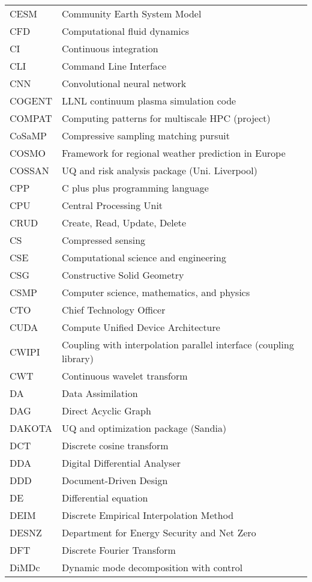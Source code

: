 \begin{longtable}{|p{4.0cm}|p{12.0cm}|}
CESM & Community Earth System Model\\
CFD  & Computational fluid dynamics \\
CI & Continuous integration\\
CLI & Command Line Interface \\
CNN  & Convolutional neural network \\
COGENT & LLNL continuum plasma simulation code\\
COMPAT & Computing patterns for multiscale HPC (project)\\
CoSaMP  & Compressive sampling matching pursuit \\
COSMO & Framework for regional weather prediction in Europe \\
COSSAN & UQ and risk analysis package (Uni. Liverpool)\\
CPP & C plus plus programming language\\
CPU & Central Processing Unit \\
CRUD & Create, Read, Update, Delete \\
CS & Compressed sensing \\
CSE & Computational science and engineering\\
CSG & Constructive Solid Geometry \\
CSMP & Computer science, mathematics, and physics\\
CTO & Chief Technology Officer \\
CUDA & Compute Unified Device Architecture \\
CWIPI & Coupling with interpolation parallel interface (coupling library)\\
CWT  & Continuous wavelet transform \\
DA & Data Assimilation\\
DAG & Direct Acyclic Graph \\
DAKOTA & UQ and optimization package (Sandia)\\
DCT  & Discrete cosine transform \\
DDA & Digital Differential Analyser\\
DDD & Document-Driven Design \\
DE & Differential equation \\
DEIM & Discrete Empirical Interpolation Method \\
DESNZ & Department for Energy Security and Net Zero  \\
DFT & Discrete Fourier Transform \\
DiMDc  & Dynamic mode decomposition with control \\

\end{longtable}
